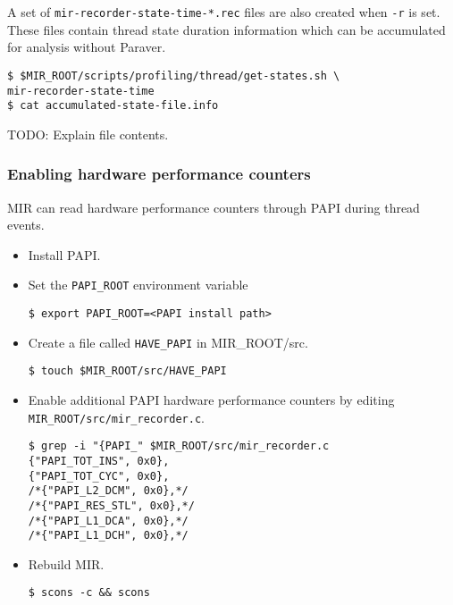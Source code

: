 \documentclass[11pt,a4paper]{article}
\begin{document}
A set of \texttt{mir-recorder-state-time-*.rec} files are also created when \texttt{-r} is set. These files contain thread state duration information which can be accumulated for analysis without Paraver.  

\begin{lstlisting}[style=MyInputStyle]
$ $MIR_ROOT/scripts/profiling/thread/get-states.sh \
mir-recorder-state-time
$ cat accumulated-state-file.info
\end{lstlisting}

TODO: Explain file contents.

\subsubsection{Enabling hardware performance counters}\label{enabling-hardware-performance-counters}

MIR can read hardware performance counters through PAPI during thread events.

\begin{itemize}
\item Install PAPI.
\item Set the \texttt{PAPI\_ROOT} environment variable

\begin{lstlisting}[style=MyInputStyle]
$ export PAPI_ROOT=<PAPI install path>
\end{lstlisting}

\item Create a file called \texttt{HAVE\_PAPI} in MIR\_ROOT/src.

\begin{lstlisting}[style=MyInputStyle]
$ touch $MIR_ROOT/src/HAVE_PAPI
\end{lstlisting}

\item Enable additional PAPI hardware performance counters by editing \texttt{MIR\_ROOT/src/mir\_recorder.c}.

\begin{lstlisting}[style=MyInputStyle]
$ grep -i "{PAPI_" $MIR_ROOT/src/mir_recorder.c
{"PAPI_TOT_INS", 0x0},
{"PAPI_TOT_CYC", 0x0},
/*{"PAPI_L2_DCM", 0x0},*/
/*{"PAPI_RES_STL", 0x0},*/
/*{"PAPI_L1_DCA", 0x0},*/
/*{"PAPI_L1_DCH", 0x0},*/
\end{lstlisting}

\item Rebuild MIR.

\begin{lstlisting}[style=MyInputStyle]
$ scons -c && scons
\end{lstlisting}
\end{itemize}
\end{document}
